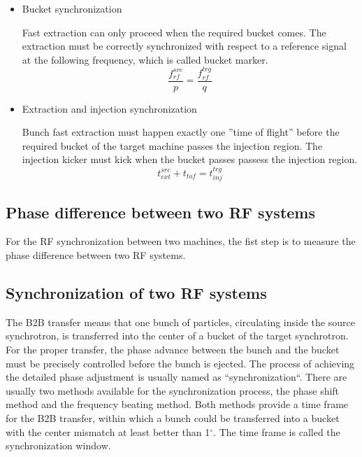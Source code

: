 \begin{itemize}
\item Bucket synchronization 

Fast extraction can only proceed when the required bucket comes. The extraction must be correctly synchronized with respect to a reference signal at the following frequency, which is called bucket marker.
\begin{equation}
	\label{eq:bucket_label}
	\frac{f_{rf}^{src}}{p} = \frac{f_{rf}^{trg}}{q}
\end{equation}

\item Extraction and injection synchronization 

Bunch fast extraction must happen exactly one ''time of flight'' before the required bucket of the target machine passes the injection region. The injection kicker must kick when the bucket passes passess the injection region.  
\begin{equation}
	\label{eq:ext_tof_inj}
	t_{ext}^{src}+t_{tof} = t_{inj}^{trg}
\end{equation}
\end{itemize}
\subsection{Phase difference between two RF systems}

For the RF synchronization between two machines, the fist step is to measure the phase difference between two RF systems.   


\subsection{Synchronization of two RF systems}
The B2B transfer means that one bunch of particles, circulating inside the source synchrotron, is transferred into the center of a bucket of the target synchrotron. For the proper transfer, the phase advance between the bunch and the bucket must be precisely controlled before the bunch is ejected. The process of achieving the detailed phase adjustment is usually named  as ``synchronization``. 
There are usually two methods available for the synchronization process, the phase shift method and the frequency beating method. Both methods provide a time frame for the B2B transfer, within which a bunch could be transferred into a bucket with the center mismatch at least better than 1$^\circ$. The time frame is called the synchronization window. 


